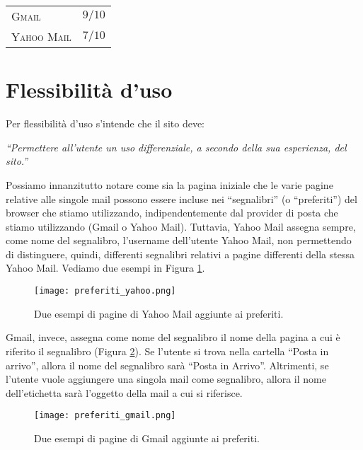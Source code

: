 		\begin{flushleft}
			\begin{tabular}{lr}
				\textsc{Gmail} & $9/10$\\
				\textsc{Yahoo Mail} & $7/10$
			\end{tabular}
		\end{flushleft}
	
	\section{Flessibilit\`{a} d'uso} \label{sec:flessibilità_uso}
	
		Per flessibilità d'uso s'intende che il sito deve:
		\begin{center}
			\begin{minipage}{0.7\textwidth}
				\textit{``Permettere all'utente un uso differenziale, a secondo della sua esperienza, del sito.''}
			\end{minipage}
		\end{center}
	
		Possiamo innanzitutto notare come sia la pagina iniziale che le varie pagine relative alle singole mail possono essere incluse nei ``segnalibri'' (o ``preferiti'') del browser che stiamo utilizzando, indipendentemente dal provider di posta che stiamo utilizzando (Gmail o Yahoo Mail). Tuttavia, Yahoo Mail assegna sempre, come nome del segnalibro, l'username dell'utente Yahoo Mail, non permettendo di distinguere, quindi, differenti segnalibri relativi a pagine differenti della stessa Yahoo Mail. Vediamo due esempi in Figura \ref{fig:preferiti_yahoo}.
		\begin{figure}[h!]
			\begin{center}
				\texttt{[image: preferiti\_yahoo.png]}
			\end{center}
			\caption[Preferiti in Yahoo Mail]{Due esempi di pagine di Yahoo Mail aggiunte ai preferiti.}
			\label{fig:preferiti_yahoo}
		\end{figure}
		
		Gmail, invece, assegna come nome del segnalibro il nome della pagina a cui è riferito il segnalibro (Figura \ref{fig:preferiti_gmail}). Se l'utente si trova nella cartella ``Posta in arrivo'', allora il nome del segnalibro sarà ``Posta in Arrivo''. Altrimenti, se l'utente vuole aggiungere una singola mail come segnalibro, allora il nome dell'etichetta sarà l'oggetto della mail a cui si riferisce.
		\begin{figure}[h!]
			\begin{center}
				\texttt{[image: preferiti\_gmail.png]}
			\end{center}
			\caption[Preferiti in Gmail]{Due esempi di pagine di Gmail aggiunte ai preferiti.}
			\label{fig:preferiti_gmail}
		\end{figure}
		
